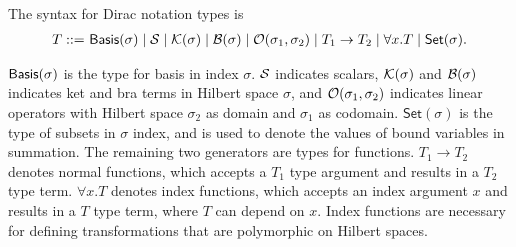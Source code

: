 \documentclass[runningheads]{llncs}
\begin{document}
\begin{definition}
    The syntax for Dirac notation types is
    \begin{align*}
        T ::=\ & \mathsf{Basis}(\sigma) \mid \mathcal{S} \mid \mathcal{K}(\sigma) \mid \mathcal{B}(\sigma) \mid \mathcal{O}(\sigma_1, \sigma_2) \mid T_1 \to T_2 \mid \forall x.T \mid \mathsf{Set}(\sigma). \\
    \end{align*}
\end{definition}
$\mathsf{Basis}(\sigma)$ is the type for basis in index $\sigma$. $\mathcal{S}$ indicates scalars, $\mathcal{K}(\sigma)$ and $\mathcal{B}(\sigma)$ indicates ket and bra terms in Hilbert space $\sigma$, and $\mathcal{O}(\sigma_1, \sigma_2)$ indicates linear operators with Hilbert space $\sigma_2$ as domain and $\sigma_1$ as codomain.
$\mathsf{Set}(\sigma)$ is the type of subsets in $\sigma$ index, and is used to denote the values of bound variables in summation.
The remaining two generators are types for functions. $T_1 \to T_2$ denotes normal functions, which accepts a $T_1$ type argument and results in a $T_2$ type term. $\forall x. T$ denotes index functions, which accepts an index argument $x$ and results in a $T$ type term, where $T$ can depend on $x$.
Index functions are necessary for defining transformations that are polymorphic on Hilbert spaces.
\end{document}
